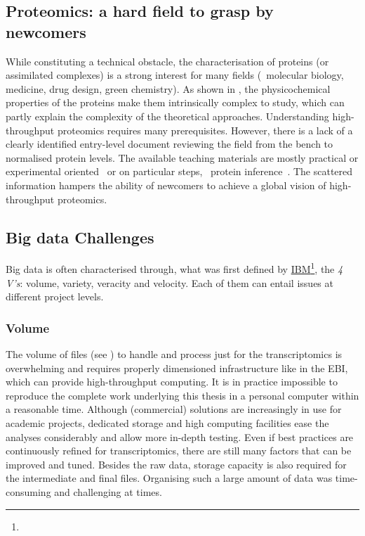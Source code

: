 \subsection*{Proteomics: a hard field to grasp by newcomers}
\vspace{-6mm}
While constituting a technical obstacle,
the characterisation of proteins (or assimilated complexes)
is a strong interest for many fields
(\eg\ molecular biology, medicine, drug design, green chemistry).
As shown in ,
the physicochemical properties of the proteins make them
intrinsically complex to study,
which can partly explain the complexity of the theoretical approaches.
Understanding high-throughput proteomics requires many prerequisites.
However, there is a lack of a clearly identified entry-level document
reviewing the field from the bench to normalised protein levels.
The available teaching materials are mostly
practical or experimental oriented~ or
on particular steps, \eg\ protein inference~.
The scattered information hampers the ability of newcomers
to achieve a global vision of high-throughput proteomics.\mybr\

\subsection*{Big data Challenges}
\vspace{-6mm}
Big data is often characterised through, what was first defined by
\href{https://www.ibmbigdatahub.com/infographic/four-vs-big-data}{IBM}\footnote{%
},
the \emph{4 V's}: volume, variety, veracity and velocity.
Each of them can entail issues at different project levels.\mybr\

\subsubsection*{Volume}
\vspace{-3mm}
The volume of files (see )
to handle and process just for the transcriptomics
is overwhelming and requires properly dimensioned infrastructure
like in the \gls{EBI}, which can provide high-throughput computing.
It is in practice impossible to reproduce the complete work underlying
this thesis in a personal computer within a reasonable time.
Although (commercial) solutions are increasingly in use for academic projects,
dedicated storage and high computing facilities ease the analyses considerably
and allow more in-depth testing.
Even if best practices are continuously refined for transcriptomics,
there are still many factors that can be improved and tuned.
Besides the raw data,
storage capacity is also required for the intermediate and final files.
Organising such a large amount of data was time-consuming and
challenging at times.\mybr\

